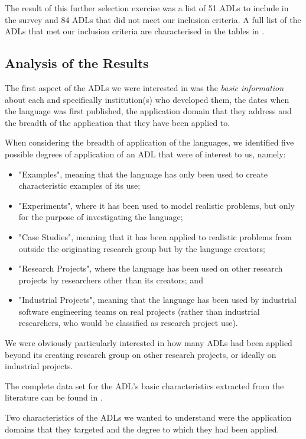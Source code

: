 The result of this further selection exercise was a list of 51 ADLs to include in the survey and 84 ADLs that did not meet our inclusion criteria.  A full list of the ADLs that met our inclusion criteria are characterised in the tables in .

\subsection{Analysis of the Results}

The first aspect of the ADLs we were interested in was the \emph{basic information} about each and specifically institution(s) who developed them, the dates when the language was first published, the application domain that they address and the breadth of the application that they have been applied to.

When considering the breadth of application of the languages, we identified five possible degrees of application of an ADL that were of interest to us, namely:
\begin{itemize}
	\item "Examples", meaning that the language has only been used to create characteristic examples of its use;
	\item "Experiments", where it has been used to model realistic problems, but only for the purpose of investigating the language;
	\item "Case Studies", meaning that it has been applied to realistic problems from outside the originating research group but by the language creators;
	\item "Research Projects", where the language has been used on other research projects by researchers other than its creators; and
	\item "Industrial Projects", meaning that the language has been used by industrial software engineering teams on real projects (rather than industrial researchers, who would be classified as research project use).
\end{itemize}

We were obviously particularly interested in how many ADLs had been applied beyond its creating research group on other research projects, or ideally on industrial projects.

The complete data set for the ADL's basic characteristics extracted from the literature can be found in .

Two characteristics of the ADLs we wanted to understand were the application domains that they targeted and the degree to which they had been applied.

